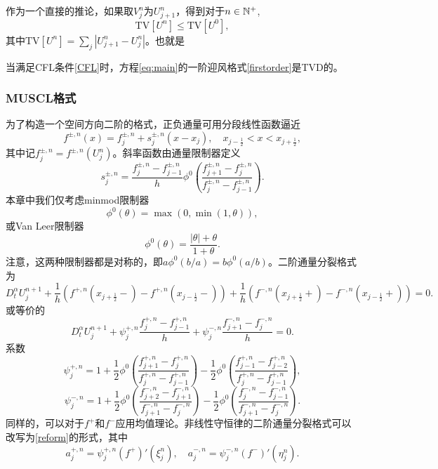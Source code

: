 作为一个直接的推论，如果取$V^n_j$为$U^{n}_{j+1}$，得到对于$n\in {\mathbb{N}}^+$,
\[
\mbox{TV}\left[U^n\right] \le \mbox{TV}\left[U^0\right]  ,
 \]
 其中$\mbox{TV}\left[U^n\right]= \sum_j | U^n_{j+1}-U^n_j | $。也就是
 \begin{cor}
 当满足CFL条件\eqref{CFL}时，方程\eqref{eq:main}的一阶迎风格式\eqref{firstorder}是TVD的。
 \end{cor}



\subsubsection{MUSCL格式}

为了构造一个空间方向二阶的格式，正负通量可用分段线性函数逼近
\[
f^{\pm,n}(x)=f^{\pm,n}_j + s^{\pm,n}_j (x-x_j),\quad x_{j-\frac 1 2}< x <x_{j+\frac 1 2},
 \] 
其中记$f^{\pm,n}_j=f^{\pm,n}(U^n_j)$。斜率函数由通量限制器定义
\[
s^{\pm,n}_j  = \frac{f^{\pm,n}_j-f^{\pm,n}_{j-1}}{h} \phi^0 \left( \frac{f^{\pm,n}_{j+1}-f^{\pm,n}_{j}}{f^{\pm,n}_j-f^{\pm,n}_{j-1}}  \right).
\]
本章中我们仅考虑minmod限制器
\[
\phi^0 (\theta) = \max (0, \min(1,\theta)),
\]
或Van Leer限制器
\[
\phi^0(\theta)= \frac{|\theta|+\theta}{1+\theta}.
\]
注意，这两种限制器都是对称的，即$a \phi^0(b/a) = b \phi^0 (a/b)$。二阶通量分裂格式为
\[
D_t^\alpha U^{n+1}_j + \frac{1}{h} \left(f^{+,n} (x_{j+\frac 1 2}-)- f^{+,n}(x_{j-\frac 1 2}-) \right)+\frac{1}{h}\left(f^{-,n} (x_{j+\frac 1 2}+)-f^{-,n} (x_{j-\frac 1 2}+)\right) =0.
\]
或等价的
\[
D_t^\alpha U^{n+1}_j + \psi_j^{+,n}\frac{f^{+,n}_j-f^{+,n}_{j-1}}{h} + \psi^{-,n}_j \frac{f^{-,n}_{j+1}-f^{-,n}_{j}}{h}=0.
\]
系数
\[
\psi_j^{+,n}=1 + \frac 1 2 \phi^0 \left(\frac{f^{+,n}_{j+1}-f^{+,n}_{j}}{f^{+,n}_j-f^{+,n}_{j-1}} \right) - \frac 1 2 \phi^0   \left(\frac{f^{+,n}_{j-1}-f^{+,n}_{j-2}}{f^{+,n}_j-f^{+,n}_{j-1}} \right),
\]
\[
\psi_j^{-,n}=1 + \frac 1 2 \phi^0 \left(\frac{f^{-,n}_{j+2}-f^{-,n}_{j+1}}{f^{-,n}_{j+1}-f^{-,n}_{j}} \right) - \frac 1 2 \phi^0   \left(\frac{f^{-,n}_{j}-f^{-,n}_{j-1}}{f^{-,n}_{j+1}-f^{-,n}_{j}} \right).
\]
同样的，可以对于$f^+$和$f^-$应用均值理论。非线性守恒律的二阶通量分裂格式可以改写为\eqref{reform}的形式，其中
\[
a^{+,n}_j=\psi_j^{+,n}(f^+)' (\xi^n_j),\quad a^{-,n}_j=\psi_j^{-,n}(f^-)' (\eta^n_j) .
\]

